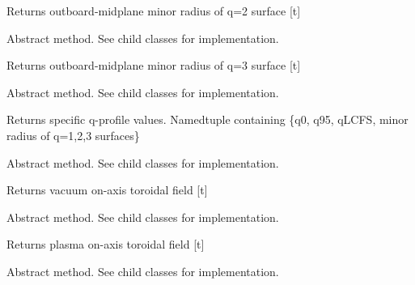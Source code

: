 \documentclass[letterpaper,10pt,english]{sphinxmanual}
\begin{document}
\begin{fulllineitems}
\begin{fulllineitems}
Returns outboard-midplane minor radius of q=2 surface {[}t{]}

\end{fulllineitems}


\begin{fulllineitems}
\label{eqtools:eqtools.core.Equilibrium.getQ3Surf}
Abstract method.  See child classes for implementation.

Returns outboard-midplane minor radius of q=3 surface {[}t{]}

\end{fulllineitems}


\begin{fulllineitems}
\label{eqtools:eqtools.core.Equilibrium.getQs}
Abstract method.  See child classes for implementation.

Returns specific q-profile values.
Namedtuple containing \{q0, q95, qLCFS, minor radius of q=1,2,3 surfaces\}

\end{fulllineitems}


\begin{fulllineitems}
\label{eqtools:eqtools.core.Equilibrium.getBtVac}
Abstract method.  See child classes for implementation.

Returns vacuum on-axis toroidal field {[}t{]}

\end{fulllineitems}


\begin{fulllineitems}
\label{eqtools:eqtools.core.Equilibrium.getBtPla}
Abstract method.  See child classes for implementation.

Returns plasma on-axis toroidal field {[}t{]}

\end{fulllineitems}


\begin{fulllineitems}
\label{eqtools:eqtools.core.Equilibrium.getBpAvg}
Abstract method.  See child classes for implementation.


\end{fulllineitems}
\end{fulllineitems}
\end{document}
